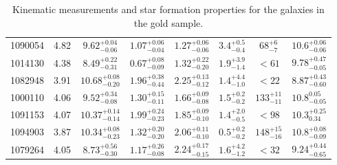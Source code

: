 \begin{table}
\begin{tabular}{c|c|c|c|c|c|c|c}
 1090054 &     4.82 & $9.62^{+0.04}_{-0.06}$  & $1.07^{+0.06}_{-0.04}$ & $1.27^{+0.06}_{-0.06}$ & $3.4^{+0.5}_{-0.4}$  & $68^{+6}_{-7}$    & $10.6^{+0.06}_{-0.06}$ \\
 1014130 &     4.38 & $8.49^{+0.22}_{-0.31}$  & $0.67^{+0.08}_{-0.09}$ & $1.32^{+0.22}_{-0.20}$ & $1.9^{+3.9}_{-1.4}$  & $<61$  & $9.78^{+0.47}_{-0.05}$ \\
 1082948 &     3.91 & $10.68^{+0.08}_{-0.20}$ & $1.96^{+0.38}_{-0.44}$ & $2.25^{+0.13}_{-0.12}$ & $1.4^{+4.4}_{-1.0}$  & $<22$   & $8.87^{+0.43}_{-0.60}$ \\
 1000110 &     4.06 & $9.52^{+0.34}_{-0.08}$  & $1.30^{+0.15}_{-0.11}$ & $1.66^{+0.09}_{-0.08}$ & $1.5^{+0.2}_{-0.2}$  & $133^{+11}_{-11}$ & $10.8^{0.05}_{-0.05}$ \\
 1091153 &     4.07 & $10.37^{+0.14}_{-0.14}$ & $1.99^{+0.24}_{-0.23}$ & $1.85^{+0.09}_{-0.10}$ & $1.4^{+2.0}_{-0.5}$  & $<98$  & $10.3^{+0.25}_{0.34}$ \\
 1094903 &     3.87 & $10.34^{+0.08}_{-0.23}$ & $1.32^{+0.20}_{-0.20}$ & $2.06^{+0.11}_{-0.10}$ & $0.5^{+0.2}_{-0.2}$  & $148^{+15}_{-16}$ & $10.8^{+0.08}_{-0.09}$ \\
 1079264 &     4.05 & $8.73^{+0.56}_{-0.30}$  & $1.17^{+0.26}_{-0.08}$ & $2.24^{+0.17}_{-0.15}$ & $1.6^{+4.2}_{-1.2}$  & $<32$  & $9.24^{+0.44}_{-0.65}$ \\

    \end{tabular}
    \caption{Kinematic measurements and star formation properties for the galaxies in the gold sample.}
    \label{tab:results-gold}
\end{table}

